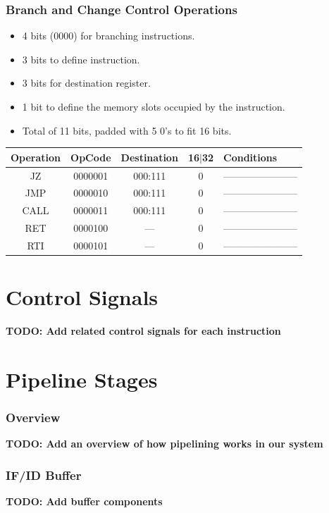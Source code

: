 \documentclass[12pt]{report}
\begin{document}
\section{Branch and Change Control Operations}
\begin{itemize}
    \item 4 bits (0000) for branching instructions.
    \item 3 bits to define instruction.
    \item 3 bits for destination register.
    \item 1 bit to define the memory slots occupied by the instruction.
    \item Total of 11 bits, padded with 5 0's to fit 16 bits. 
\end{itemize}
\begin{center}
 \begin{tabular}{||c| c| c| c| p{40mm}||} 
 \hline
 Operation & OpCode & Destination & 16$|$32 & Conditions  \\ [0.5ex] 
 \hline\hline
 JZ & 0000001 & 000:111 & 0 & ----------------------- \\
 \hline
 JMP & 0000010 & 000:111 & 0 & ----------------------- \\
 \hline
 CALL & 0000011 & 000:111 & 0 & ----------------------- \\
 \hline
 RET & 0000100 & --- & 0 & ----------------------- \\
 \hline
 RTI & 0000101 & --- & 0 & ----------------------- \\
 \hline
\end{tabular}
\end{center}

\part{Control Signals}
\textbf{TODO: Add related control signals for each instruction}

\part{Pipeline Stages}

\section{Overview}
\textbf{TODO: Add an overview of how pipelining works in our system}

\section{IF/ID Buffer}
\textbf{TODO: Add buffer components}
\end{document}
